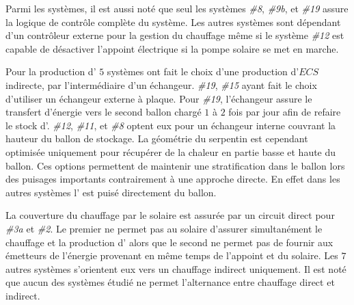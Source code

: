 Parmi les systèmes, il est aussi noté que seul les systèmes \emph{\#8}, \emph{\#9b},
et \emph{\#19} assure la logique de contrôle complète du système. Les autres systèmes
sont dépendant d’un contrôleur externe pour la gestion du chauffage même si le système
\emph{\#12} est capable de désactiver l’appoint électrique si la pompe solaire se met en marche.

Pour la production d’ $5$ systèmes ont fait le choix d’une production
d’$ECS$ indirecte, par l’intermédiaire d’un échangeur. \emph{\#19}, \emph{\#15} ayant fait le
choix d’utiliser un échangeur externe à plaque. Pour \emph{\#19}, l’échangeur
assure le transfert d’énergie vers le second ballon chargé $1$ à $2$ fois par jour afin
de refaire le stock d’. \emph{\#12}, \emph{\#11}, et \emph{\#8} optent eux pour
un échangeur interne couvrant la hauteur du ballon de stockage. La géométrie
du serpentin est cependant optimisée uniquement pour récupérer de la chaleur en
partie basse et haute du ballon. Ces options permettent de maintenir une
stratification dans le ballon lors des puisages importants contrairement à une approche
directe. En effet dans les autres systèmes l’ est puisé directement du ballon.

La couverture du chauffage par le solaire est assurée par un circuit direct pour
\emph{\#3a} et \emph{\#2}. Le premier ne permet pas au solaire d’assurer simultanément
le chauffage et la production d’ alors que le second ne permet pas de fournir
aux émetteurs de l’énergie provenant en même temps de l’appoint et du solaire.
Les $7$ autres systèmes s’orientent eux vers un chauffage indirect uniquement. Il est noté que
aucun des systèmes étudié ne permet l’alternance entre chauffage direct et indirect.

